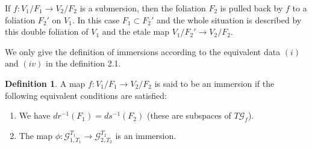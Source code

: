 \documentclass[12pt]{amsart}
\theoremstyle{definition}
\newtheorem{defn}[thm]{Definition}
\theoremstyle{remark}
\numberwithin{equation}{section}
\newcommand{\CG}{{\mathcal G}}
\begin{document}
If $f: V_1/F_1 \to V_2/F_2$ is a submersion, then the foliation $F_2$ is pulled back by $f$ to a foliation $F_2'$ on $V_1$. In this case $F_1 \subset F_2'$ and the whole situation is described by this double foliation of $V_1$ and the etale map $V_1/F_2' \to V_2/F_2$.

We only give the definition of immersions according to the equivalent data $(i)$ and $(iv)$ in the definition 2.1.

\begin{defn}
A map $f: V_1/ F_1 \to V_2/F_2$ is said to be an immersion if the following equivalent conditions are satisfied:
\begin{enumerate}
    \item We have $dr^{-1}(F_1) = ds^{-1}(F_2)$ (these are subspaces of $T\CG_f$).
    \item The map $\phi: \CG_{1, T_1}^{T_1} \to \CG_{2, T_2}^{T_2} $ is an immersion.
\end{enumerate}
\end{defn}
\end{document}
